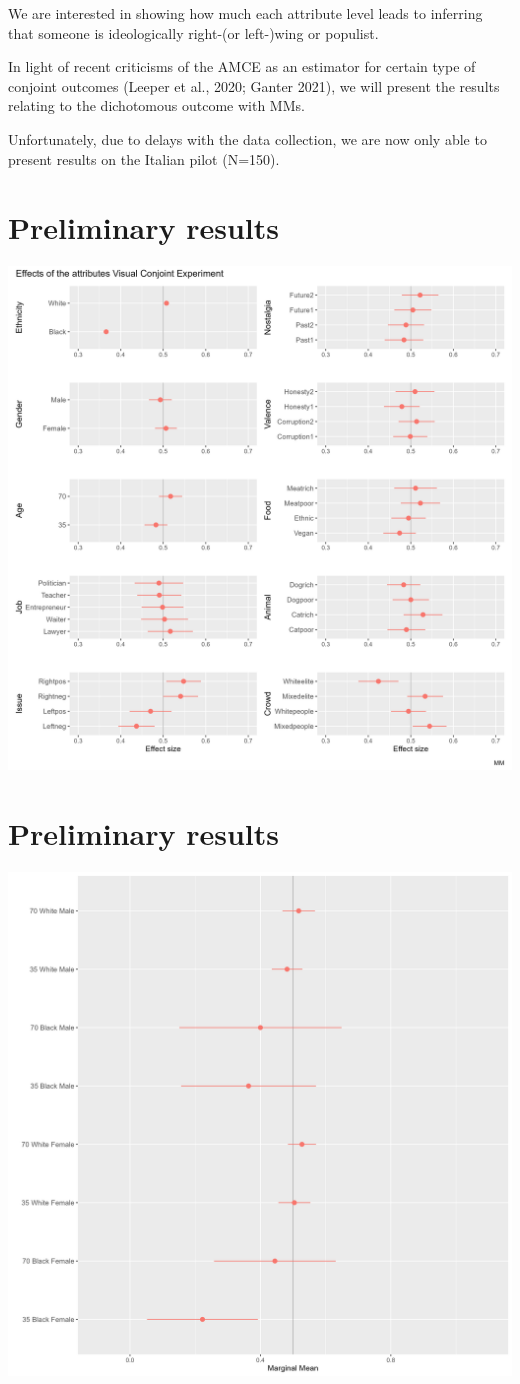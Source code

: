 \documentclass[
]{article}
\begin{document}
We are interested in showing how much each attribute level leads to
inferring that someone is ideologically right-(or left-)wing or
populist.

In light of recent criticisms of the AMCE as an estimator for certain
type of conjoint outcomes (Leeper et al., 2020; Ganter 2021), we will
present the results relating to the dichotomous outcome with MMs.

Unfortunately, due to delays with the data collection, we are now only
able to present results on the Italian pilot (N=150).

\section{Preliminary results}\label{preliminary-results}

\begin{center}\includegraphics[width=0.7\linewidth]{images/singlecountry} \end{center}

\section{Preliminary results}\label{preliminary-results-1}

\begin{center}\includegraphics[width=0.75\linewidth]{images/interaction1} \end{center}
\end{document}
